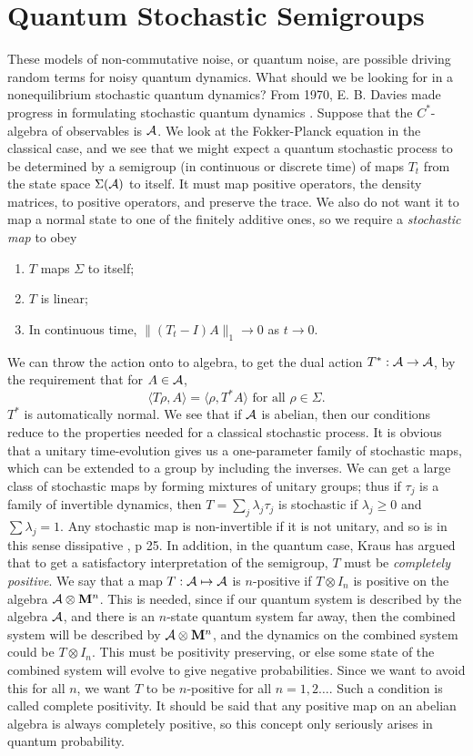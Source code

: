 \section{Quantum Stochastic Semigroups}
These models of non-commutative noise, or quantum noise, are possible
driving random terms for noisy quantum dynamics.
What should we be looking for in a nonequilibrium stochastic quantum
dynamics? From 1970, E. B. Davies made progress in formulating stochastic
quantum dynamics \cite{Davies}.
Suppose that the $C^*$-algebra of observables is ${\cal A}$.
We look at the Fokker-Planck equation in the classical case, and we see that
we might expect a quantum stochastic process to be determined by a
semigroup (in continuous or discrete time) of maps $T_t$
from the state space $\Sigma({\cal A})$ to itself. It must map positive
operators, the density matrices, to positive operators, and preserve the
trace. We also do not want it to map a normal state to one of the
finitely additive ones, so we require a {\em stochastic map} to obey
\begin{enumerate}
\item $T$ maps $\Sigma$ to itself;
\item $T$ is linear;
\item In continuous time, $\|(T_t-I)A\|_1\rightarrow 0$ as $t\rightarrow0$.
\end{enumerate}
We can throw the action onto to algebra, to get the dual action $T^*:
{\cal A}\rightarrow{\cal A}$, by the requirement that for $A\in{\cal A}$,
\[\langle T\rho,A\rangle=\langle\rho,T^*A\rangle\mbox{ for all }\rho\in\Sigma.\]
$T^*$ is automatically normal. We see that if ${\cal A}$ is abelian,
then our conditions reduce to the properties
needed for a classical stochastic process. It is obvious that a
unitary time-evolution gives us a one-parameter family of
stochastic maps, which can be extended to a group by including the
inverses. We can get a large class of stochastic maps by
forming mixtures of unitary groups; thus if $\tau_j$ is a family of
invertible dynamics, then $T=\sum_j\lambda_j\tau_j$ is stochastic if
$\lambda_j\geq0$ and $\sum\lambda_j=1$.
Any stochastic map is non-invertible if
it is not unitary, and so is in this sense dissipative \cite{Davies}, p 25.
In addition, in the quantum case, Kraus \cite{Kraus} has argued that
to get a satisfactory interpretation of the semigroup, $T$ must be
{\em completely positive}. We say that a map $T:{\cal A}\mapsto{\cal A}$
is $n$-positive if $T\otimes I_n$ is positive on the algebra ${\cal A}\otimes{\bf
M}^n$. This is needed, since if our quantum system is described by the
algebra ${\cal A}$, and there is an $n$-state quantum system far away,
then the combined system will be described by ${\cal A}\otimes{\bf M}^n$,
and the dynamics on the combined system could be $T\otimes I_n$. This
must be positivity preserving, or else some state of the combined system
will evolve to give negative probabilities. Since we want to avoid this for
all $n$, we want $T$ to be $n$-positive for all $n=1,2\ldots$. Such a
condition is called complete positivity. It should be said that any
positive map on an abelian algebra is always completely positive, so this
concept only seriously arises in quantum probability.

